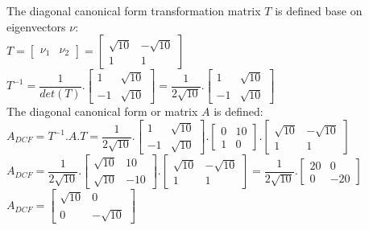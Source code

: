 \documentclass[14pt,a4paper]{article}
\begin{document}
\begin{enumerate}
	The diagonal canonical form transformation matrix $T$ is defined base on eigenvectors $\nu$: \\
		$T = \begin{bmatrix} \nu_1 & \nu_2	\end{bmatrix} = \begin{bmatrix} \sqrt{10} & -\sqrt{10} \\ 1&1 \end{bmatrix} $\\
	
		$T^{-1} = \dfrac{1}{det(T)}.\begin{bmatrix} 1 & \sqrt{10} \\ -1& \sqrt{10} \end{bmatrix} = \dfrac{1}{2\sqrt{10}}.\begin{bmatrix} 1&\sqrt{10} \\ -1 & \sqrt{10} \end{bmatrix} $\\
	
	The diagonal canonical form or matrix $A$ is defined: \\
		$A_{DCF} = T^{-1}.A.T = \dfrac{1}{2\sqrt{10}}.\begin{bmatrix} 1&\sqrt{10} \\ -1 & \sqrt{10} \end{bmatrix} .\begin{bmatrix} 0&10 \\ 1&0 \end{bmatrix} .\begin{bmatrix} \sqrt{10} & -\sqrt{10} \\ 1&1 \end{bmatrix} $\\
	
		$A_{DCF} = \dfrac{1}{2\sqrt{10}}. \begin{bmatrix} \sqrt{10} & 10 \\ \sqrt{10} & -10 \end{bmatrix} .\begin{bmatrix} \sqrt{10} & -\sqrt{10} \\ 1&1 \end{bmatrix} = \dfrac{1}{2\sqrt{10}} .\begin{bmatrix} 20 & 0 \\ 0&-20 \end{bmatrix} $\\

		$A_{DCF} = \begin{bmatrix} \sqrt{10} & 0 \\ 0 & -\sqrt{10} \end{bmatrix}	$ \\
		
\end{enumerate}
\end{document}
